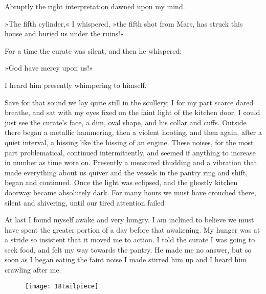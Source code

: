 Abruptly the right interpretation dawned upon my mind.

»The fifth cylinder,« I whispered, »the fifth shot from Mars, has struck this house and buried us under the ruins!«

For a time the curate was silent, and then he whispered:

»God have mercy upon us!«

I heard him presently whimpering to himself.

Save for that sound we lay quite still in the scullery; I for my part scarce dared breathe, and sat with my eyes fixed on the faint light of the kitchen door. I could just see the curate's face, a dim, oval shape, and his collar and cuffs. Outside there began a metallic hammering, then a violent hooting, and then again, after a quiet interval, a hissing like the hissing of an engine. These noises, for the most part problematical, continued intermittently, and seemed if anything to increase in number as time wore on. Presently a measured thudding and a vibration that made everything about us quiver and the vessels in the pantry ring and shift, began and continued. Once the light was eclipsed, and the ghostly kitchen doorway became absolutely dark. For many hours we must have crouched there, silent and shivering, until our tired attention failed\textellipsis

At last I found myself awake and very hungry. I am inclined to believe we must have spent the greater portion of a day before that awakening. My hunger was at a stride so insistent that it moved me to action. I told the curate I was going to seek food, and felt my way towards the pantry. He made me no answer, but so soon as I began eating the faint noise I made stirred him up and I heard him crawling after me.

\begin{figure}[b!]
\centering
\texttt{[image: 18tailpiece]}
\end{figure}